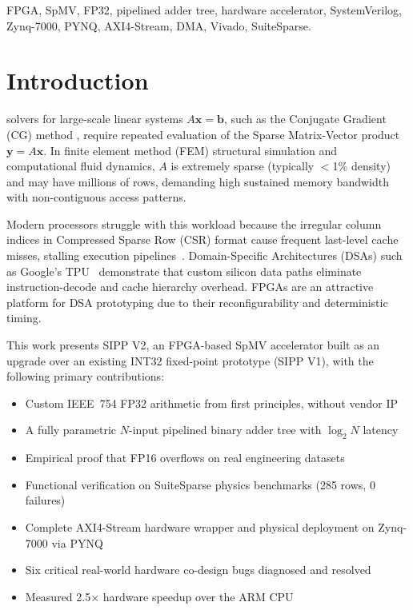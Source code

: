 \documentclass[journal,a4paper]{IEEEtran}
\begin{document}
\begin{IEEEkeywords}
FPGA, SpMV, FP32, pipelined adder tree, hardware accelerator,
SystemVerilog, Zynq-7000, PYNQ, AXI4-Stream, DMA, Vivado, SuiteSparse.
\end{IEEEkeywords}

\section{Introduction}

 solvers for large-scale linear systems
$A\mathbf{x} = \mathbf{b}$, such as the Conjugate Gradient (CG) method
\cite{hestenes1952}, require repeated evaluation of the Sparse
Matrix-Vector product $\mathbf{y} = A\mathbf{x}$.
In finite element method (FEM) structural simulation and computational
fluid dynamics, $A$ is extremely sparse (typically $<$1\% density)
and may have millions of rows, demanding high sustained memory bandwidth
with non-contiguous access patterns.

Modern processors struggle with this workload because the irregular column
indices in Compressed Sparse Row (CSR) format cause frequent last-level
cache misses, stalling execution pipelines~\cite{williams2009}.
Domain-Specific Architectures (DSAs) such as Google's
TPU~\cite{jouppi2017} demonstrate that custom silicon data paths eliminate
instruction-decode and cache hierarchy overhead. FPGAs are an attractive
platform for DSA prototyping due to their reconfigurability and
deterministic timing.

This work presents SIPP V2, an FPGA-based SpMV accelerator built as an
upgrade over an existing INT32 fixed-point prototype (SIPP V1), with the
following primary contributions:
\begin{itemize}
  \item Custom IEEE~754 FP32 arithmetic from first principles, without vendor IP
  \item A fully parametric $N$-input pipelined binary adder tree with
        $\log_2 N$ latency
  \item Empirical proof that FP16 overflows on real engineering datasets
  \item Functional verification on SuiteSparse physics benchmarks
        (285 rows, 0 failures)
  \item Complete AXI4-Stream hardware wrapper and physical deployment on
        Zynq-7000 via PYNQ
  \item Six critical real-world hardware co-design bugs diagnosed and resolved
  \item Measured 2.5$\times$ hardware speedup over the ARM CPU
\end{itemize}
\end{document}
